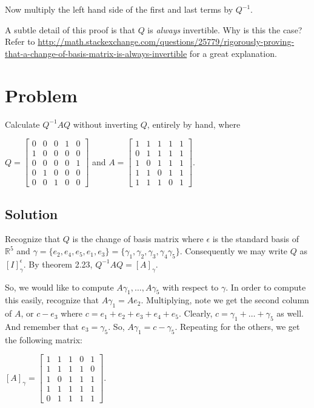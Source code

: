 \documentclass[twoside]{article}
\theoremstyle{definition}
\theoremstyle{definition}
\theoremstyle{remark}
\def\R{{\mathbb R}}
\begin{document}
Now multiply the left hand side of the first and last terms by $Q^{-1}$. 

A subtle detail of this proof is that $Q$ is \emph{always} invertible. Why is this the case? Refer to \url{http://math.stackexchange.com/questions/25779/rigorously-proving-that-a-change-of-basis-matrix-is-always-invertible} for a great explanation.


\section{Problem}

Calculate $Q^{-1} A Q$ without inverting $Q$, entirely by hand, where

$Q = 
\begin{bmatrix}
    0 & 0 & 0 & 1 & 0 \\
    1 & 0 & 0 & 0  & 0 \\
    0 & 0 & 0 & 0 & 1\\
    0 & 1 & 0 & 0 & 0\\
    0 & 0 & 1 & 0 & 0
\end{bmatrix}
$ and $A = 
\begin{bmatrix}
    1 & 1 & 1 & 1 & 1 \\
    0 & 1 & 1 & 1 & 1 \\
    1 & 0 & 1 & 1 & 1 \\
    1 & 1 & 0 & 1 & 1 \\
    1 & 1 & 1 & 0 & 1 
\end{bmatrix}
$.

\subsection{Solution}

Recognize that $Q$ is the change of basis matrix where $\epsilon$ is the standard basis
of $\R^5$ and $\gamma = \{e_2, e_4, e_5, e_1, e_3\} = \{\gamma_1, \gamma_2, \gamma_3, \gamma_4 \gamma_5\}$. Consequently we may write $Q$ as
$[I]^{\epsilon}_{\gamma}$. By theorem 2.23, $Q^{-1} A Q = [A]_{\gamma}$.

So, we would like to compute $A \gamma_1, \ldots, A \gamma_5$ with respect to $\gamma$.
In order to compute this easily, recognize that $A \gamma_1 = A e_2$. Multiplying, note
we get the second column of $A$, or $c - e_3$ where $c = e_1 + e_2 + e_3 + e_4 + e_5$.
Clearly, $c = \gamma_1 + \ldots + \gamma_5$ as well. And remember that $e_3 = \gamma_5$.
So, $A\gamma_1 = c - \gamma_5$. Repeating for the others, we get the following matrix:

$[A]_{\gamma} = 
\begin{bmatrix}
    1 & 1 & 1 & 0 & 1 \\
    1 & 1 & 1 & 1 & 0 \\
    1 & 0 & 1 & 1 & 1 \\
    1 & 1 & 1 & 1 & 1 \\
    0 & 1 & 1 & 1 & 1 
\end{bmatrix}$.
\end{document}
